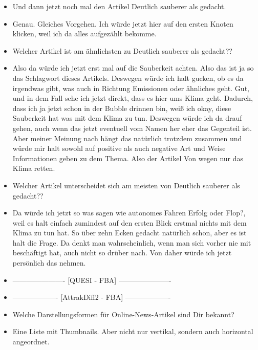 {\begin{itemize}[]
    Ich war gerade am Überlegen, wie ich am besten alle aufgezählt bekomme, aber dann wahrscheinlich oben mit dem Knoten und dann sehe ich den hier direkt.
    \item {} Und dann jetzt noch mal den Artikel \flqq Deutlich sauberer als gedacht\frqq{}.
    \item {} Genau. Gleiches Vorgehen. Ich würde jetzt hier auf den ersten Knoten klicken, weil ich da alles aufgezählt bekomme.
    \item {} Welcher Artikel ist am ähnlichsten zu \flqq Deutlich sauberer als gedacht?\frqq{}?
    \item {} Also da würde ich jetzt erst mal auf die Sauberkeit achten.
    Also das ist ja so das Schlagwort dieses Artikels.
    Deswegen würde ich halt gucken, ob es da irgendwas gibt, was auch in Richtung Emissionen oder ähnliches geht.
    Gut, und in dem Fall sehe ich jetzt direkt, dass es hier ums Klima geht.
    Dadurch, dass ich ja jetzt schon in der Bubble drinnen bin, weiß ich okay, diese Sauberkeit hat was mit dem Klima zu tun.
    Deswegen würde ich da drauf gehen, auch wenn das jetzt eventuell vom Namen her eher das Gegenteil ist.
    Aber meiner Meinung nach hängt das natürlich trotzdem zusammen und würde mir halt sowohl auf positive als auch negative Art und Weise Informationen geben zu dem Thema. 
    Also der Artikel \flqq Von wegen nur das Klima retten\frqq{}.
    \item {} Welcher Artikel unterscheidet sich am meisten von \flqq Deutlich sauberer als gedacht?\frqq{}?
    \item {} Da würde ich jetzt so was sagen wie \flqq autonomes Fahren Erfolg oder Flop?\frqq{}, weil es halt einfach zumindest auf den ersten Blick erstmal nichts mit dem Klima zu tun hat.
    So über zehn Ecken gedacht natürlich schon, aber es ist halt die Frage.
    Da denkt man wahrscheinlich, wenn man sich vorher nie mit beschäftigt hat, auch nicht so drüber nach.
    Von daher würde ich jetzt persönlich das nehmen.
    \item {----------------------} [QUESI - FBA] {----------------------}
    \item {-------------------} [AttrakDiff2 - FBA] {-------------------}
    \item {} Welche Darstellungsformen für Online-News-Artikel sind Dir bekannt?
    \item {} Eine Liste mit Thumbnails. 
    Aber nicht nur vertikal, sondern auch horizontal angeordnet.

\end{itemize}}
